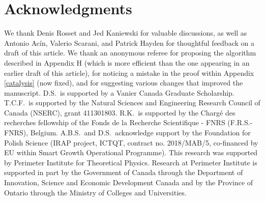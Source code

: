 \documentclass[prx,11pt,letterpaper,twocolumn,accepted=2023-11-27]{quantumarticle}
\theoremstyle{plain}
\theoremstyle{definition}
\begin{document}
\section*{Acknowledgments}
We thank Denis Rosset and Jed Kaniewski for valuable discussions, as well as Antonio Ac\'in, Valerio Scarani, and Patrick Hayden for thoughtful feedback on a draft of this article.  
 We thank an anonymous referee for proposing the algorithm described in Appendix H (which is more efficient than the one appearing in an earlier draft of this article), for noticing a mistake in the proof within Appendix \ref{catalysis} (now fixed), and for suggesting various changes that improved the manuscript.
D.S.~is supported by a Vanier Canada Graduate Scholarship. T.C.F.~is supported by the Natural Sciences and Engineering Research Council of Canada (NSERC), grant  411301803.
 R.K.~is supported by the Charg\'e des recherches fellowship of the Fonds de la Recherche Scientifique - FNRS (F.R.S.-FNRS), Belgium. A.B.S.~and D.S.~acknowledge  support by the Foundation for Polish Science (IRAP project, ICTQT, contract no. 2018/MAB/5, co-financed by EU within Smart Growth Operational Programme). This research was supported by Perimeter Institute for Theoretical Physics. Research at Perimeter Institute is supported in part by the Government of Canada through the Department of Innovation, Science and Economic Development Canada and by the Province of Ontario through the Ministry of Colleges and Universities.

%


\end{document}
